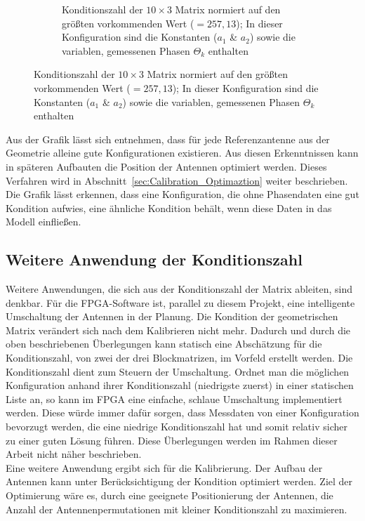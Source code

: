 \begin{figure}[h!]
\begin{subfigure}[t]{0.45\textwidth}
                 \caption{Konditionszahl der $10\times3$ Matrix normiert auf den größten vorkommenden Wert ($=257,13$); In dieser Konfiguration sind die Konstanten ($a_1$ \& $a_2$) sowie die variablen, gemessenen Phasen $\Theta_k$ enthalten}
                 \label{fig:AnalyzeOf10x3}
         \end{subfigure}
%
\end{figure}
%
Aus der Grafik lässt sich entnehmen, dass für jede Referenzantenne aus der Geometrie alleine gute Konfigurationen existieren. Aus diesen Erkenntnissen kann in späteren Aufbauten die Position der Antennen optimiert werden. Dieses Verfahren wird in Abschnitt~\ref{sec:Calibration_Optimaztion} weiter beschrieben. Die Grafik lässt erkennen, dass eine Konfiguration, die ohne Phasendaten eine gut Kondition aufwies, eine ähnliche Kondition behält, wenn diese Daten in das Modell einfließen.
\\
%
\subsection{Weitere Anwendung der Konditionszahl}
Weitere Anwendungen, die sich aus der Konditionszahl der Matrix ableiten, sind denkbar. Für die FPGA-Software ist, parallel zu diesem Projekt, eine intelligente Umschaltung der Antennen in der Planung. Die Kondition der geometrischen Matrix verändert sich nach dem Kalibrieren nicht mehr. Dadurch und durch die oben beschriebenen Überlegungen kann statisch eine Abschätzung für die Konditionszahl, von zwei der drei Blockmatrizen, im Vorfeld erstellt werden. Die Konditionszahl dient zum Steuern der Umschaltung. Ordnet man die möglichen Konfiguration anhand ihrer Konditionszahl (niedrigste zuerst) in einer statischen Liste an, so kann im FPGA eine einfache, schlaue Umschaltung implementiert werden. Diese würde immer dafür sorgen, dass Messdaten von einer Konfiguration bevorzugt werden, die eine niedrige Konditionszahl hat und somit relativ sicher zu einer guten Lösung führen. Diese Überlegungen werden im Rahmen dieser Arbeit nicht näher beschrieben.\\
Eine weitere Anwendung ergibt sich für die Kalibrierung. Der Aufbau der Antennen kann unter Berücksichtigung der Kondition optimiert werden. Ziel der Optimierung wäre es, durch eine geeignete Positionierung der Antennen, die Anzahl der Antennenpermutationen mit kleiner Konditionszahl zu maximieren.